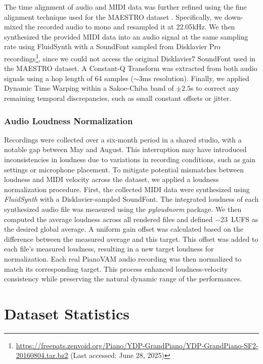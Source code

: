 \documentclass{article}
\begin{document}
The time alignment of audio and MIDI data was further refined using the fine alignment technique used for the MAESTRO dataset \cite{ICLR19Hawthorne}. 
Specifically, we down-mixed the recorded audio to mono and resampled it at {22.05}\si{kHz}. 
We then synthesized the provided MIDI data into an audio signal at the same sampling rate using FluidSynth with a SoundFont sampled from Disklavier Pro recordings\footnote{\href{https://freepats.zenvoid.org/Piano/YDP-GrandPiano/YDP-GrandPiano-SF2-20160804.tar.bz2}{https://freepats.zenvoid.org/Piano/YDP-GrandPiano/YDP-GrandPiano-SF2-20160804.tar.bz2} (Last accessed: June 28, 2025)\label{soundfont}}, since we could not access the original Disklavier7 SoundFont used in the MAESTRO dataset.
A Constant-Q Transform was extracted from both audio signals using a hop length of 64 samples ($\sim$3\si{ms} resolution). Finally, we applied Dynamic Time Warping within a Sakoe-Chiba band of $\pm2.5$\si{s} to correct any remaining temporal discrepancies, such as small constant offsets or jitter.


\subsubsection{Audio Loudness Normalization} 
Recordings were collected over a six-month period in a shared studio, with a notable gap between May and August. This interruption may have introduced inconsistencies in loudness due to variations in recording conditions, such as gain settings or microphone placement. To mitigate potential mismatches between loudness and MIDI velocity across the dataset, we applied a loudness normalization procedure. First, the collected MIDI data were synthesized using \textit{FluidSynth} with a Disklavier-sampled SoundFont. The integrated loudness of each synthesized audio file was measured using the \textit{pyloudnorm} package\cite{steinmetz2021pyloudnorm}. We then computed the average loudness across all rendered files and defined $-$23~\si{LUFS} as the desired global average. A uniform gain offset was calculated based on the difference between the measured average and this target. This offset was added to each file's measured loudness, resulting in a new target loudness for normalization. Each real PianoVAM audio recording was then normalized to match its corresponding target. This process enhanced loudness-velocity consistency while preserving the natural dynamic range of the performances.

\section{Dataset Statistics}\label{sec:dataset-statistics}
\end{document}
